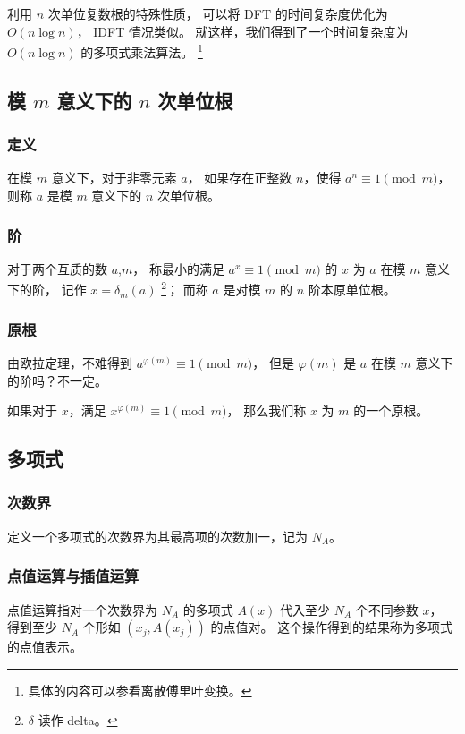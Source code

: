\documentclass[12pt, UTF8]{article}
\begin{document}
    \bigskip
    利用 $n$ 次单位复数根的特殊性质，
    可以将 DFT 的时间复杂度优化为 $O(n \log n)$，
    IDFT 情况类似。
    就这样，我们得到了一个时间复杂度为 $O(n \log n)$ 的多项式乘法算法。
    \footnote{具体的内容可以参看离散傅里叶变换。}

    \subsection{模 $m$ 意义下的 $n$ 次单位根}
    \subsubsection{定义}
    在模 $m$ 意义下，对于非零元素 $a$，
    如果存在正整数 $n$，使得 $a^n \equiv 1 \pmod {m}$，
    则称 $a$ 是模 $m$ 意义下的 $n$ 次单位根。

    \subsubsection{阶}
    对于两个互质的数 $a$,$m$，
    称最小的满足 $a^x \equiv 1 \pmod {m}$ 的 $x$ 为 $a$ 在模 $m$ 意义下的阶，
    记作 $x = \delta_m(a)$ \footnote{$\delta$ 读作 delta。}；
    而称 $a$ 是对模 $m$ 的 $n$ 阶本原单位根。

    \subsubsection{原根}
    由欧拉定理，不难得到 $a^{\varphi(m)} \equiv 1 \pmod {m}$，
    但是 $\varphi(m)$ 是 $a$ 在模 $m$ 意义下的阶吗？不一定。

    \bigskip
    如果对于 $x$，满足 $x^{\varphi(m)} \equiv 1 \pmod {m}$，
    那么我们称 $x$ 为 $m$ 的一个原根。

    \subsection{多项式}
    \subsubsection{次数界}
    定义一个多项式的次数界为其最高项的次数加一，记为 $N_A$。

    \subsubsection{点值运算与插值运算}
    点值运算指对一个次数界为 $N_A$ 的多项式 $A(x)$
    代入至少 $N_A$ 个不同参数 $x$，
    得到至少 $N_A$ 个形如 $(x_j, A(x_j))$ 的点值对。
    这个操作得到的结果称为多项式的点值表示。
\end{document}
